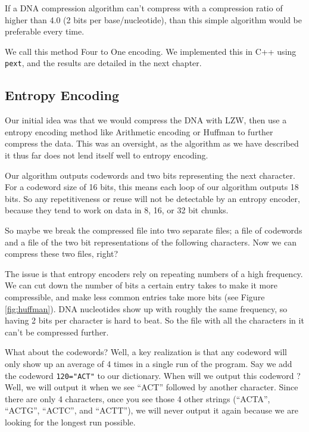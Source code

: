 \documentclass[12pt,twoside]{reedthesis}
\begin{document}
If a DNA compression algorithm can't compress with a compression ratio of higher than 4.0 (2 bits per base/nucleotide), than this simple algorithm would be preferable every time.

We call this method Four to One encoding. We implemented this in C++ using \texttt{pext}, and the results are detailed in the next chapter.

\hypertarget{entropy-encoding}{%
\subsection{Entropy Encoding}\label{entropy-encoding}}

Our initial idea was that we would compress the DNA with LZW, then use a entropy encoding method like Arithmetic encoding or Huffman to further compress the data. This was an oversight, as the algorithm as we have described it thus far does not lend itself well to entropy encoding.

Our algorithm outputs codewords and two bits representing the next character. For a codeword size of 16 bits, this means each loop of our algorithm outputs 18 bits. So any repetitiveness or reuse will not be detectable by an entropy encoder, because they tend to work on data in 8, 16, or 32 bit chunks.

So maybe we break the compressed file into two separate files; a file of codewords and a file of the two bit representations of the following characters. Now we can compress these two files, right?

The issue is that entropy encoders rely on repeating numbers of a high frequency. We can cut down the number of bits a certain entry takes to make it more compressible, and make less common entries take more bits (see Figure \ref{fig:huffman}). DNA nucleotides show up with roughly the same frequency, so having 2 bits per character is hard to beat. So the file with all the characters in it can't be compressed further.

What about the codewords? Well, a key realization is that any codeword will only show up an average of 4 times in a single run of the program. Say we add the codeword \texttt{120="ACT"} to our dictionary. When will we output this codeword ? Well, we will output it when we see ``ACT'' followed by another character. Since there are only 4 characters, once you see those 4 other strings (``ACTA'', ``ACTG'', ``ACTC'', and ``ACTT''), we will never output it again because we are looking for the longest run possible.
\end{document}
